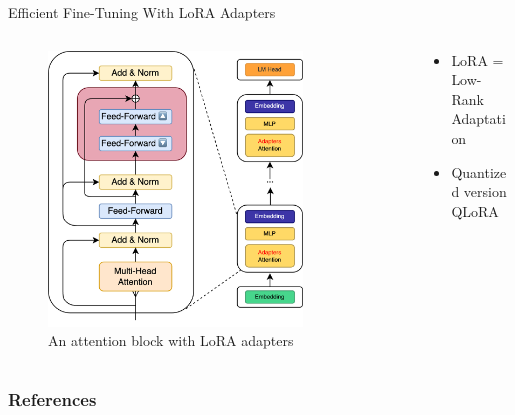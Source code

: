 \documentclass[11pt,aspectratio=169]{beamer}
\begin{document}
\begin{frame}{Efficient Fine-Tuning With LoRA Adapters~\cite{hu2021loralowrankadaptationlarge}}
    \begin{columns}
        \begin{column}{0.5\linewidth}
            \vspace{-0.2cm}
            \begin{figure}
                \centering
                \includegraphics[width=0.8\textwidth]{llama-adapter.png}
                \caption{\centering An attention block with LoRA adapters}
            \end{figure}
        \end{column}
        \begin{column}{0.5\linewidth}
            \begin{itemize}
                \item LoRA = Low-Rank Adaptation
                \item Quantized version QLoRA~\cite{dettmers2023qloraefficientfinetuningquantized}
            \end{itemize}
        \end{column}
    \end{columns}    
\end{frame}

\begin{frame}
    \frametitle{References}
    \printbibliography
\end{frame}
\end{document}
